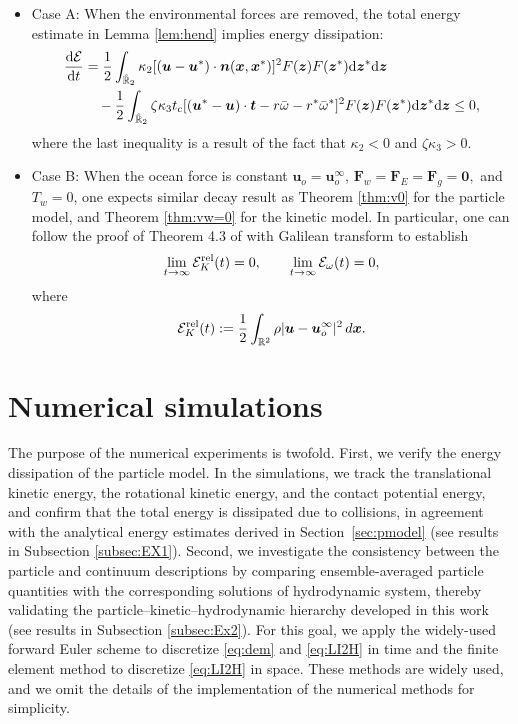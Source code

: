 \documentclass[a4paper,11pt]{article}
\numberwithin{equation}{section}
\theoremstyle{definition}
\newcommand{\bfx}{\boldsymbol{x}}
\newcommand{\bfz}{\boldsymbol{z}}
\newcommand{\bfzr}{\boldsymbol{0}}
\newcommand{\bfn}{\boldsymbol{n}}
\newcommand{\bft}{\boldsymbol{t}}
\newcommand{\bfu}{\boldsymbol{u}_o}
\newcommand{\bfuu}{\boldsymbol{u}}
\newcommand{\bfF}{\boldsymbol{F}}
\newcommand{\bbr}{\mathbb R}
\def\d{{  \rm d}}
\newcommand{\E}{\mathcal{E}}
\begin{document}
\begin{itemize}

\item Case A: When the environmental forces are removed, the total energy estimate  in Lemma \ref{lem:hend} implies energy dissipation:
\begin{align*}
    \frac{\d \E}{\d t} & = \frac{1}{2}  \int_{\hat{\bbr}_2}   \kappa_2 [ (\bfuu  - \bfuu^*) \cdot \bfn(\bfx, \bfx^*)]^2  F(\bfz) F(\bfz^*)\d\bfz^*\d\bfz \\
    & \quad - \frac12 \int_{\hat{\bbr}_2}  \zeta\kappa_3 t_c[(\bfuu^* - \bfuu)\cdot \bft - r\bar\omega -r^*\bar\omega^*]^2 F(\bfz)  F(\bfz^*)\d\bfz^*\d\bfz \le 0,
\end{align*}
where the last inequality is a result of the fact that $\kappa_2<0$ and $\zeta\kappa_3>0.$ 

\item Case B: When the ocean force is constant $\bfu = \bfu^\infty$, $\bfF_w=\bfF_E=\bfF_g=\bfzr,$ and $T_w=0$, one expects similar decay result as Theorem \ref{thm:v0} for the particle model, and Theorem \ref{thm:vw=0} for the kinetic model. 
In particular, 
one can follow the proof of Theorem 4.3 of \cite{deng2025particle} with Galilean transform to establish  
\[
\lim_{t\to \infty}\E_K^{\rm rel}(t)=0,
\qquad
\lim_{t\to \infty}\E_\omega(t)=0,
\]
where
\[
\E_K^{\rm rel}(t)
:=
\frac12
\int_{\bbr^2}
\rho|\bfuu-\bfu^\infty|^2\,d\bfx .
\]
\end{itemize}


\section{Numerical simulations} \label{sec:num}
The purpose of the numerical experiments is twofold.
First, we verify the energy dissipation of the particle model.
In the simulations, we track the translational kinetic energy, the
rotational kinetic energy, and the contact potential energy, and confirm
that the total energy is dissipated
due to collisions, in agreement with the analytical energy estimates derived in
Section~\ref{sec:pmodel} (see results in Subsection \ref{subsec:EX1}).
Second, we investigate the consistency between the particle and continuum
descriptions by comparing ensemble-averaged particle quantities with the
corresponding solutions of hydrodynamic system, thereby validating the particle--kinetic--hydrodynamic hierarchy developed in this work (see results in Subsection \ref{subsec:Ex2}).
%
For this goal,
we apply the widely-used forward Euler scheme \cite{butcher2016numerical,hairer1993solving} to discretize \eqref{eq:dem} and \eqref{eq:LI2H} in time and the finite element method \cite{deng2021softfem,hughes2003finite} to discretize \eqref{eq:LI2H} in space. These methods are widely used, and we omit the details of the implementation of the numerical methods for simplicity. 
\end{document}

